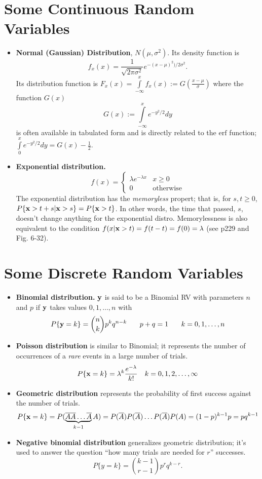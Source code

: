\documentclass[a4paper, oneside]{book}
\begin{document}
\section{Some Continuous Random Variables}
\begin{itemize}
\item \textbf{Normal (Gaussian) Distribution}, $N(\mu, \sigma^2)$. Its density function is$$f_x(x) = \frac{1}{\sqrt{2 \pi \sigma^2}}e^{-(x-\mu)^2)/2\sigma^2}.$$
Its distribution function is $F_x(x) = \int\limits_{-\infty}^x  f_x(x) := G(\frac{x-\mu}{\sigma})$ where the function $G(x)$%
$$G(x) := \int\limits_{-\infty}^x e^{-y^2/2}dy$$  is often available in tabulated form and is directly related to the $\text{erf}$ function; $\int\limits_{0}^x e^{-y^2/2}dy  = G(x) - \frac{1}{2}.$

\item \textbf{Exponential distribution.} $$f(x) = \begin{cases} \lambda e^{-\lambda x}  & x\ge 0 \\ 0 & \text{otherwise} \end{cases}$$
The exponential distribution has the \textit{memoryless} propert; that is, for $s,t\ge 0$, $P\{\mathbf x> t+s | \mathbf x >s\} =P \{\mathbf x >t\} $. In other words, the time that passed, $s$, doesn't change anything for the exponential distro. Memorylessness is also equivalent to the condition $f(x | \mathbf x > t) = f(t-t) =  f(0) = \lambda$ (see p229 and Fig. 6-32).
\end{itemize}

\section{Some Discrete Random Variables}
\begin{itemize}
\item \textbf{Binomial distribution.} $\mathbf y$ is said to be a Binomial RV with parameters $n$ and $p$ if $\mathbf y$ takes values $0,1,\hdots, n$ with %
$$ P\{\mathbf y = k\} = \binom nk p^k q^{n-k}\,\,\,\,\,\,\,\,\,\,\, p+q=1\,\,\,\,\,\,\,\,\,\,\,k=0,1,\hdots,n $$
\item \textbf{Poisson distribution} is similar to Binomial; it represents the number of occurrences of a \textit{rare} events in a large number of trials.  $$P\{\mathbf x = k\} = \lambda^k \frac{e^{-\lambda}}{k!}\,\,\,\,\,\, k=0,1,2,\hdots,\infty$$
\item \textbf{Geometric distribution} represents the probability of first success against the number of trials. $$P\{\mathbf x = k\} = P(\underbrace{\overline{A}\overline{A}\hdots\overline{A}}_{k-1}A) = P(\overline{A})P(\overline{A})\hdots P(\overline{A}) P(A) = (1-p)^{k-1}p =  pq^{k-1} $$
\item \textbf{Negative binomial distribution} generalizes geometric distribution; it's used to answer the question ``how many trials are needed for $r$'' successes. $$P\{y=k\} = \binom{k-1}{r-1}p^r q^{k-r}.$$
\end{itemize}
\end{document}
